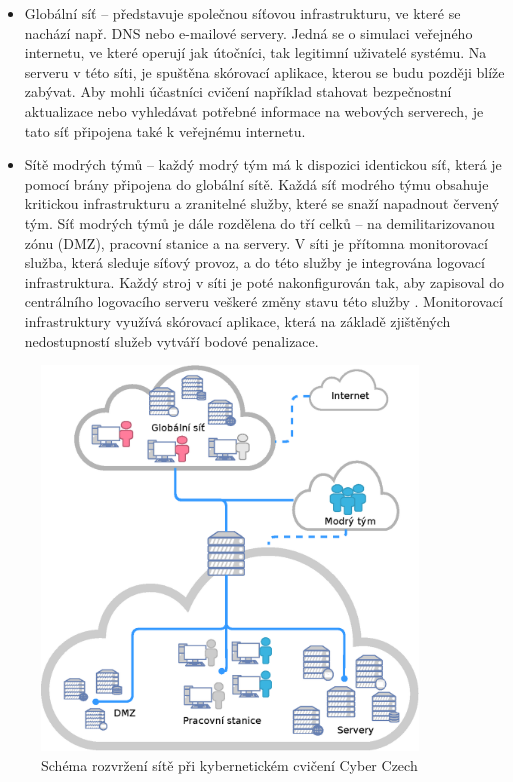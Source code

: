 \documentclass[
  digital,
  twoside,
  table, 
  nolof, 
  nolot
]{fithesis3}
\begin{document}
\begin{itemize}
    \item Globální síť -- představuje společnou síťovou infrastrukturu, ve které se nachází např. DNS nebo e-mailové servery. Jedná se o simulaci veřejného internetu, ve které operují jak útočníci, tak legitimní uživatelé systému. Na serveru v této síti, je spuštěna skórovací aplikace, kterou se budu později blíže zabývat. Aby mohli účastníci cvičení například stahovat bezpečnostní aktualizace nebo vyhledávat potřebné informace na webových serverech, je tato síť připojena také k veřejnému internetu.
    \item Sítě modrých týmů -- každý modrý tým má k dispozici identickou síť, která je pomocí brány připojena do globální sítě. Každá síť modrého týmu obsahuje kritickou infrastrukturu a zranitelné služby, které se snaží napadnout červený tým. Síť modrých týmů je dále rozdělena do tří celků -- na demilitarizovanou zónu (DMZ), pracovní stanice a na servery. V síti je přítomna monitorovací služba, která sleduje síťový provoz, a do této služby je integrována logovací infrastruktura. Každý stroj v síti je poté nakonfigurován tak, aby zapisoval do centrálního logovacího serveru veškeré změny stavu této služby \cite{CeledaKYPO-AExercises}. Monitorovací infrastruktury využívá skórovací aplikace, která na základě zjištěných nedostupností služeb vytváří bodové penalizace.
\end{itemize}

\begin{figure}[h]
    \centering
    \includegraphics[width=10cm]{images/kypo-network.eps}
    \caption{Schéma rozvržení sítě při kybernetickém cvičení Cyber Czech \cite{Vykopal2017LessonsRange}}
    \label{fig:kypoNetwork}
\end{figure}
\end{document}
